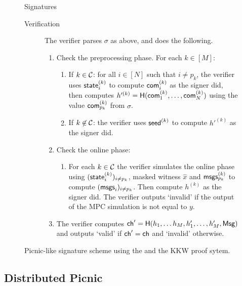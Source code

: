 \begin{figure}[p]
\begin{minipage}[t]{1.1\textwidth}
\begin{protocolbox}{\ttOWF Signatures}
\begin{description}
    \item[Verification] The verifier parses $\sigma$ as above, and does the following.  
    \begin{enumerate}
        \item Check the preprocessing phase. For each $k\in[M]$:
        \begin{enumerate}
        \item If $k \in \mathcal{C}$: for all $i\in[N]$  such that $i \neq p_k$, the verifier uses $\textsf{state}^{(k)}_{i}$ to compute $\textsf{com}^{(k)}_{i}$ as 
            the signer did, then computes $h'^{(k)} = \textsf{H}(\textsf{com}^{(k)}_{1},\ldots,\textsf{com}^{(k)}_{N})$ using 
            the value $\textsf{com}^{(k)}_{p_k}$ from $\sigma$. 
        \item If $k\not\in\mathcal{C}$: the verifier uses $\textsf{seed}^{(k)}$ to compute $h'^{(k)}$ as the signer did.
        \end{enumerate} 
        
        \item Check the online phase:
        \begin{enumerate}
            \item For each $k \in \mathcal{C}$ the verifier simulates the online phase using $(\textsf{state}^{(k)}_{i})_{i \neq p_k}$,  
                masked witness $\hat{x}$ and $\textsf{msgs}^{(k)}_{p_k}$ to compute $(\textsf{msgs}_i)_{i \neq p_k}$. 
                Then compute $h^{(k)}$ as the signer did. The verifier outputs `invalid' if the output of the MPC simulation is not equal to $y$.
        \end{enumerate}
    \item The verifier computes $\textsf{ch}' = \textsf{H}(h_1, \ldots h_M, h_1', \ldots, h_M', \textsf{Msg})$ and outputs `valid' if $\textsf{ch}' = \textsf{ch}$ and `invalid' otherwise. 
    \end{enumerate}
 \end{description}
 \end{protocolbox}
 \end{minipage}
	\vspace*{-10pt}
	\caption{\label{fig:23-picnic}Picnic-like signature scheme using the \ttOWF and the KKW proof sytem.} 
\end{figure}


\subsection{Distributed Picnic}
